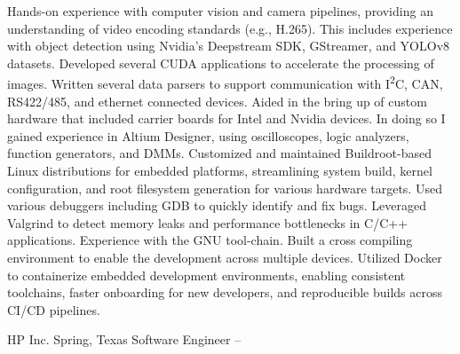 \documentclass[letterpaper,MMMyyyy,nonstopmode]{simpleresumecv}
\begin{document}
\begin{Body}
    \begin{Detail}
        \BulletItem
        Hands-on experience with computer vision and camera pipelines, providing an understanding of video encoding standards (e.g., H.265). This includes experience with object detection using Nvidia's Deepstream SDK, GStreamer, and YOLOv8 datasets.
        \vspace{1mm} %
        \BulletItem
        Developed several CUDA applications to accelerate the processing of images.
        \vspace{1mm} %
        \BulletItem
        Written several data parsers to support communication with I\textsuperscript{2}C, CAN, RS422/485, and ethernet connected devices.
        \vspace{1mm} %
        \BulletItem
        Aided in the bring up of custom hardware that included carrier boards for Intel and Nvidia devices. In doing so I gained experience in Altium Designer, using oscilloscopes, logic analyzers, function generators, and DMMs.
        \vspace{1mm} %
        \BulletItem
        Customized and maintained Buildroot-based Linux distributions for embedded platforms, streamlining system build, kernel configuration, and root filesystem generation for various hardware targets.
        \vspace{1mm} %
        \BulletItem
        Used various debuggers including GDB to quickly identify and fix bugs. Leveraged Valgrind to detect memory leaks and performance bottlenecks in C/C++ applications.
        \vspace{1mm} %
        \BulletItem
        Experience with the GNU tool-chain. Built a cross compiling environment to enable the development across multiple devices.
        \vspace{1mm} %
        \BulletItem
        Utilized Docker to containerize embedded development environments, enabling consistent toolchains, faster onboarding for new developers, and reproducible builds across CI/CD pipelines.
        \vspace{1mm} %
    \end{Detail}

    \vspace{3mm} %

    \SubSection
    {HP Inc.}
    {Spring, Texas}
    {Software Engineer}
    { -- }


\end{Body}
\end{document}
